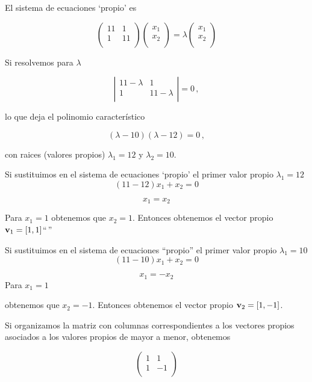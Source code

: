 \documentclass[
]{agujournal2019}
\begin{document}
El sistema de ecuaciones `propio' es

\[\left(\begin{array}{cc}
  11 & 1 \\
  1 & 11 \\
      \end{array}\right)\left(\begin{array}{cc}
  x_1 \\
  x_2 \\
      \end{array}\right)=\lambda\left(\begin{array}{cc}
  x_1 \\
  x_2 \\
      \end{array}\right)\]

Si resolvemos para \(\lambda\)

\[\left|\begin{array}{cc}
  11-\lambda & 1 \\
  1 & 11-\lambda \\
      \end{array}\right|=0\,,\]

lo que deja el polinomio característico

\[(\lambda-10)(\lambda-12)=0\,,\]

con raices (valores propios) \(\lambda_1=12\) y \(\lambda_2=10\).

Si sustituimos en el sistema de ecuaciones `propio' el primer valor
propio \(\lambda_1=12\) \[(11-12)x_1 + x_2=0\]

\[x_1=x_2\]

Para \(x_1=1\) obtenemos que \(x_2=1\). Entonces obtenemos el vector
propio \({\textbf v}_1=[1,1]\)``\,''

Si sustituimos en el sistema de ecuaciones ``propio'' el primer valor
propio \(\lambda_1=10\) \[(11-10)x_1 + x_2=0\]

\[x_1=-x_2\] Para \(x_1=1\)

obtenemos que \(x_2=-1\). Entonces obtenemos el vector propio
\({\textbf v}_2=[1,-1]\).

Si organizamos la matriz con columnas correspondientes a los vectores
propios asociados a los valores propios de mayor a menor, obtenemos

\[\left(\begin{array}{cc}
  1 & 1 \\
  1 & -1 \\
      \end{array}\right)\]
\end{document}
